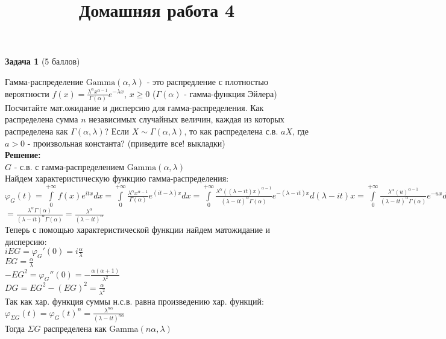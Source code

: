 \documentclass{article}
\title{Домашняя работа 4}
\newcommand\Gammad{\text{Gamma}}
\begin{document}
\maketitle
\textbf{Задача 1} (5 баллов)

Гамма-распределение $\Gammad(\alpha, \lambda)$ - это распредление с плотностью вероятности $f(x) = \frac{ \lambda^\alpha x^{\alpha - 1} }{ \Gamma(\alpha) } e^{-\lambda x}$, $x \geq 0$ ($\Gamma(\alpha)$ - гамма-функция Эйлера)
Посчитайте мат.ожидание и дисперсию для гамма-распределения. Как распределена сумма $n$ независимых случайных величин, каждая из которых распределена как $\Gamma(\alpha, \lambda)$? Если $X \sim \Gamma(\alpha, \lambda)$, то как распределена с.в. $aX$, где $a > 0$ - произвольная константа? (приведите все! выкладки)\\

\textbf{Решение:}\\
$G$ - с.в. с гамма-распределением $\Gammad(\alpha, \lambda)$\\
Найдем характеристическую функцию гамма-распределения:\\
$\varphi_G(t) = \int\limits_0^{+\infty} f(x)e^{itx}dx = \int\limits_0^{+\infty} \frac{ \lambda^\alpha x^{\alpha - 1} }{ \Gamma(\alpha) } e^{(it -\lambda )x} dx = \int\limits_0^{+\infty} \frac{ \lambda^\alpha ((\lambda - it)x)^{\alpha - 1} }{ (\lambda - it)^{\alpha}\Gamma(\alpha) } e^{-(\lambda - it)x} d(\lambda - it)x = \int\limits_0^{+\infty} \frac{ \lambda^\alpha (u)^{\alpha - 1} }{ (\lambda - it)^{\alpha}\Gamma(\alpha) } e^{-ux} du =$\\
$= \frac{ \lambda^\alpha \Gamma(\alpha) }{ (\lambda - it)^{\alpha}\Gamma(\alpha) } = \frac{ \lambda^\alpha}{(\lambda - it)^{\alpha}}$\\
Теперь с помощью характеристической функции найдем матожидание и дисперсию:\\
$iEG = \varphi_{G}'(0) = i\frac{\alpha}{\lambda}$\\
$EG = \frac{\alpha}{\lambda}$\\
$-EG^2 = \varphi_{G}''(0) = -\frac{\alpha(\alpha+1)}{\lambda ^2}$\\
$DG = EG^2 - (EG)^2 = \frac{\alpha}{\lambda^2}$\\
Так как хар. функция суммы н.с.в. равна произведению хар. функций:\\
$\varphi_{\Sigma G}(t) = \varphi_G(t)^n = \frac{ \lambda^{n\alpha}}{(\lambda - it)^{{n\alpha}}}$\\
Тогда $\Sigma G$ распределена как $\Gammad(n\alpha, \lambda)$\\
\end{document}

